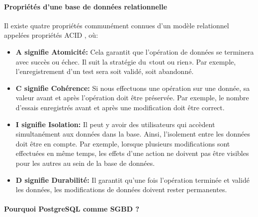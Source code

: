         \paragraph{Propriétés d'une base de données relationnelle}
         Il existe quatre propriétés communément connues d'un modèle relationnel appelées propriétés ACID \cite{typedb}, où:
         \begin{itemize}
                 \item \textbf{A signifie Atomicité: }
                  Cela garantit que l'opération de données se terminera 
                 avec succès ou échec. Il suit la stratégie du «tout ou rien». Par exemple, 
                 l'enregistrement d'un test sera soit validé, soit abandonné.
                 \item \textbf{C signifie Cohérence: }
                  Si nous effectuons une opération sur une donnée, 
                 sa valeur avant et après l'opération doit être préservée. Par exemple, 
                 le nombre d'essais enregistrés avant et après une modification doit être correct.
                 \item \textbf{I signifie Isolation: }
                 Il peut y avoir des utilisateurs  
                 qui accèdent simultanément aux données dans la base. 
                 Ainsi, l'isolement entre les données doit être en compte. Par exemple, 
                 lorsque plusieurs modifications sont effectuées en même temps, les effets 
                 d'une action ne doivent pas être visibles pour les autres
                 au sein de la base de données.
                 \item \textbf{D signifie Durabilité: }
                 Il garantit qu'une fois l'opération terminée et validé les données, 
                 les modifications de données doivent rester permanentes.

         \end{itemize}
         \paragraph{Pourquoi PostgreSQL comme SGBD ?}
